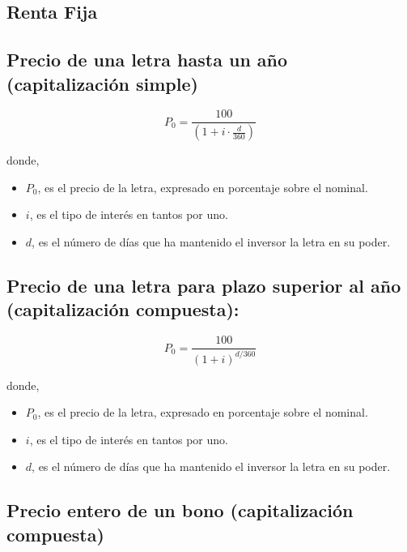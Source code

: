 \documentclass[
  letterpaper,
  DIV=11,
  numbers=noendperiod]{scrreprt}
\begin{document}
\begin{tcolorbox}
\section{\texorpdfstring{\textbf{Renta
Fija}}{Renta Fija}}\label{renta-fija}

\subsection*{Precio de una letra hasta un año (capitalización
simple)}\label{precio-de-una-letra-hasta-un-auxf1o-capitalizaciuxf3n-simple}

\[P_0=\frac{100}{\left(1+i\cdot\frac{d}{360}\right)}\]

donde,

\begin{itemize}
\item
  \(P_0\), es el precio de la letra, expresado en porcentaje sobre el
  nominal.
\item
  \(i\), es el tipo de interés en tantos por uno.
\item
  \(d\), es el número de días que ha mantenido el inversor la letra en
  su poder.
\end{itemize}

\subsection*{Precio de una letra para plazo superior al año
(capitalización
compuesta):}\label{precio-de-una-letra-para-plazo-superior-al-auxf1o-capitalizaciuxf3n-compuesta}

\[P_0=\frac{100}{(1+i)^{d/360}}\]

donde,

\begin{itemize}
\item
  \(P_0\), es el precio de la letra, expresado en porcentaje sobre el
  nominal.
\item
  \(i\), es el tipo de interés en tantos por uno.
\item
  \(d\), es el número de días que ha mantenido el inversor la letra en
  su poder.
\end{itemize}

\subsection*{Precio entero de un bono (capitalización
compuesta)}\label{precio-entero-de-un-bono-capitalizaciuxf3n-compuesta}


\end{tcolorbox}
\end{document}
